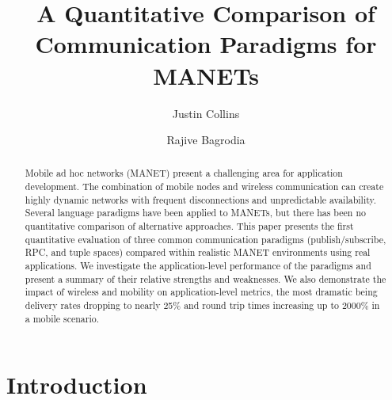 \documentclass[lnicst]{svmultln}
\begin{document}
\mainmatter  

\title{A Quantitative Comparison of Communication Paradigms for MANETs}


\author{Justin Collins\and Rajive Bagrodia}




\maketitle
\begin{abstract}
Mobile ad hoc networks (MANET) present a challenging area for application development. The combination of mobile nodes and wireless communication can create highly dynamic networks with frequent disconnections and unpredictable availability. Several language paradigms have been applied to MANETs, but there has been no quantitative comparison of alternative approaches. This paper presents the first quantitative evaluation of three common communication paradigms (publish/subscribe, RPC, and tuple spaces) compared within realistic MANET environments using real applications. We investigate the application-level performance of the paradigms and present a summary of their relative strengths and weaknesses. We also demonstrate the impact of wireless and mobility on application-level metrics, the most dramatic being delivery rates dropping to nearly 25\% and round trip times increasing up to 2000\% in a mobile scenario.

\end{abstract}

\section{Introduction}

\end{document}
